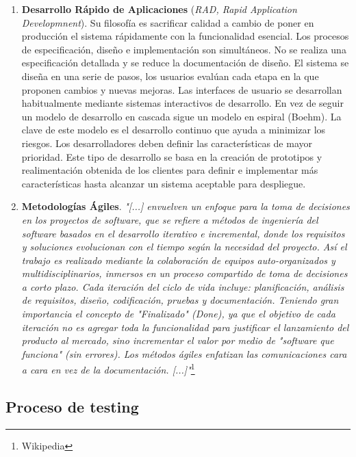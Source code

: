 \begin{enumerate}
\item \textbf{Desarrollo Rápido de Aplicaciones} (\emph{RAD, Rapid Application Developmnent}). Su filosofía es sacrificar calidad a cambio de poner en producción el sistema rápidamente con la funcionalidad esencial. Los procesos de especificación, diseño e implementación son simultáneos. No se realiza una especificación detallada y se reduce la documentación de diseño. El sistema se diseña en una serie de pasos, los usuarios evalúan cada etapa en la que proponen cambios y nuevas mejoras. Las interfaces de usuario se desarrollan habitualmente mediante sistemas interactivos de desarrollo. En vez de seguir un modelo de desarrollo en cascada sigue un modelo en espiral (Boehm). La clave de este modelo es el desarrollo continuo que ayuda a minimizar los riesgos. Los desarrolladores deben definir las características de mayor prioridad. Este tipo de desarrollo se basa en la creación de prototipos y realimentación obtenida de los clientes para definir e implementar más características hasta alcanzar un sistema aceptable para despliegue.

\item \textbf{Metodologías Ágiles}. \emph{"[...] envuelven un enfoque para la toma de decisiones en los proyectos de software, que se refiere a métodos de ingeniería del software basados en el desarrollo iterativo e incremental, donde los requisitos y soluciones evolucionan con el tiempo según la necesidad del proyecto. Así el trabajo es realizado mediante la colaboración de equipos auto-organizados y multidisciplinarios, inmersos en un proceso compartido de toma de decisiones a corto plazo. Cada iteración del ciclo de vida incluye:  planificación, análisis de requisitos, diseño, codificación, pruebas y  documentación. Teniendo gran importancia el concepto de "Finalizado" (Done), ya que el objetivo de cada iteración no es agregar toda la funcionalidad para justificar el lanzamiento del producto al mercado, sino incrementar el valor por medio de "software que funciona" (sin errores). Los métodos ágiles enfatizan las comunicaciones cara a cara en vez de la documentación. [...]"}\footnote{Wikipedia}
\end{enumerate}

\subsection{Proceso de testing}

